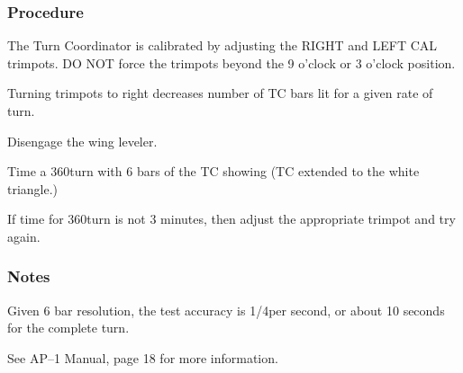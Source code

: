 % 
% 
%
 \subsubsection*{Procedure}
 \begin{compactenum}
    \item The Turn Coordinator is calibrated by adjusting the RIGHT and LEFT CAL trimpots.  DO NOT force the trimpots beyond the 9 o'clock or 3 o'clock position.
    \item Turning trimpots to right decreases number of TC bars lit for a given rate of turn.
    \item Disengage the wing leveler.
    \item Time a 360\textdegree turn with 6 bars of the TC showing (TC extended to the white triangle.)
    \item If time for 360\textdegree turn is not 3 minutes, then adjust the appropriate trimpot and try again.
    \end{compactenum}

 \subsubsection*{Notes}
 \begin{compactenum}
    \item Given 6 bar resolution, the test accuracy is 1/4\textdegree per second, or about 10 seconds for the complete turn.
    \item See AP--1 Manual, page 18 for more information.
    \end{compactenum}
